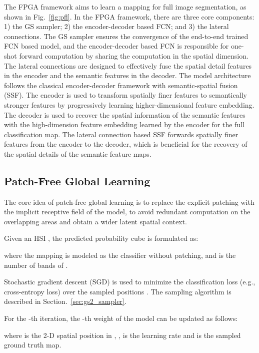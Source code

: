 \documentclass[journal]{IEEEtran}
\begin{document}
The FPGA framework aims to learn a mapping  for full image segmentation, as shown in Fig.~\ref{fig:pfl}.
In the FPGA framework, there are three core components: 1) the GS sampler; 2) the encoder-decoder based FCN; and 3) the lateral connections.
The GS sampler ensures the convergence of the end-to-end trained FCN based model, and the encoder-decoder based FCN is responsible for one-shot forward computation by sharing the computation in the spatial dimension.
The lateral connections are designed to effectively fuse the spatial detail features in the encoder and the semantic features in the decoder.
The model architecture follows the classical encoder-decoder framework \cite{long2015fully, ronneberger2015u, badrinarayanan2017segnet, chen2017deeplab} with semantic-spatial fusion (SSF).
The encoder is used to transform spatially finer features to semantically stronger features by progressively learning higher-dimensional feature embedding.
The decoder is used to recover the spatial information of the semantic features with the high-dimension feature embedding learned by the encoder for the full classification map.
The lateral connection based SSF forwards spatially finer features from the encoder to the decoder, which is beneficial for the recovery of the spatial details of the semantic feature maps.


\subsection{Patch-Free Global Learning}
The core idea of patch-free global learning is to replace the explicit patching with the implicit receptive field of the model, to avoid redundant computation on the overlapping areas and obtain a wider latent spatial context.

Given an HSI , the predicted probability cube  is formulated as:

where the mapping  is modeled as the classifier without patching, and  is the number of bands of .

Stochastic gradient descent (SGD) \cite{robbins1951stochastic} is used to minimize the classification loss  (e.g., cross-entropy loss) over the sampled positions .
The sampling algorithm is described in Section.~\ref{sec:gs2_sampler}.

For the -th iteration, the -th weight of the model can be updated as follows:

where  is the 2-D spatial position in , ,  is the learning rate and  is the sampled ground truth map.
\end{document}

